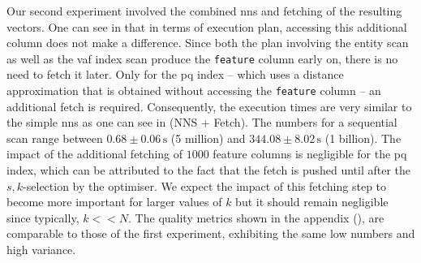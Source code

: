 Our second experiment involved the combined \acrshort{nns} and fetching of the resulting vectors. One can see in  that in terms of execution plan, accessing this additional column does not make a difference. Since both the plan involving the entity scan as well as the \acrshort{vaf} index scan produce the \texttt{feature} column early on, there is no need to fetch it later. Only for the \acrshort{pq} index -- which uses a distance approximation that is obtained without accessing the \texttt{feature} column -- an additional fetch is required. Consequently, the execution times are very similar to the simple \acrshort{nns} as one can see in  (NNS + Fetch). The numbers for a sequential scan range between $0.68 \pm 0.06 \, \si{\second}$ (5 million) and $344.08 \pm 8.02 \, \si{\second}$ (1 billion). The impact of the additional fetching of $1000$ feature columns is negligible for the \acrshort{pq} index, which can be attributed to the fact that the fetch is pushed until after the $s,k$-selection by the optimiser. We expect the impact of this fetching step to become more important for larger values of $k$ but it should remain negligible since typically, $k << N$. The quality metrics shown in the appendix (), are comparable to those of the first experiment, exhibiting the same low numbers and high variance.

